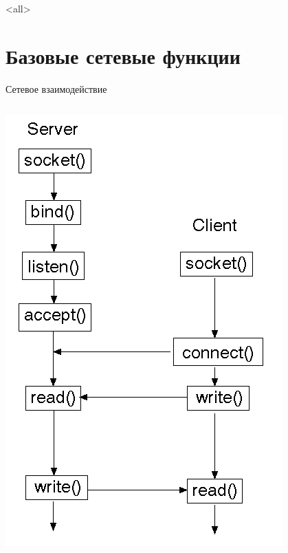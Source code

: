 

\subtitle{Программный интерфейс взаимодействия сокетов Беркли\\(продолжение)}



\mode<all>{}

%
%

\section{Базовые сетевые функции}
\begin{frame}{Сетевое взаимодействие}
	\begin{columns}
	\begin{center}
		\includegraphics[height=0.8\textheight]{06-tcp_seq.png}
	\end{center}

\end{columns}
\end{frame}
